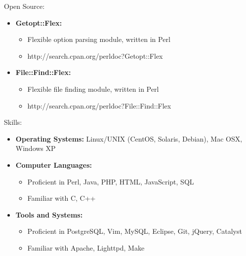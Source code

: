 \documentclass[10pt,oneside]{article}
\newenvironment{ressection}[1]{
	\vspace{4pt}
	{\fontfamily{phv}\selectfont\Large#1}
	\begin{itemize}
	\vspace{3pt}
}{
	\end{itemize}
}
\newcommand{\resitem}[1]{
	\vspace{-4pt}
	\item \begin{flushleft} #1 \end{flushleft}
}
\newcommand{\ressubitem}[1]{
	\vspace{-1pt}
	\item \begin{flushleft} #1 \end{flushleft}
}
\newenvironment{reslist}[1]{
	\resitem{\textbf{#1}}
	\vspace{-5pt}
	\begin{itemize}
}{
	\end{itemize}
}
\begin{document}
\begin{ressection}{Open Source:}

	\begin{reslist}{Getopt::Flex:}
		\ressubitem{Flexible option parsing module, written in Perl}
		\ressubitem{http://search.cpan.org/perldoc?Getopt::Flex}
	\end{reslist}

	\begin{reslist}{File::Find::Flex:}
		\ressubitem{Flexible file finding module, written in Perl}
		\ressubitem{http://search.cpan.org/perldoc?File::Find::Flex}
	\end{reslist}

\end{ressection}

\begin{ressection}{Skills:}

    \resitem{\textbf{Operating Systems:} Linux/UNIX (CentOS, Solaris, Debian), Mac OSX, Windows XP}

	\begin{reslist}{Computer Languages:}
		\ressubitem{Proficient in Perl, Java, PHP, HTML, JavaScript, SQL}
		\ressubitem{Familiar with C, C++}
	\end{reslist}

	\begin{reslist}{Tools and Systems:}
		\ressubitem{Proficient in PostgreSQL, Vim, MySQL, Eclipse, Git, jQuery, Catalyst}
		\ressubitem{Familiar with Apache, Lighttpd, Make}
	\end{reslist}

\end{ressection}
\end{document}
